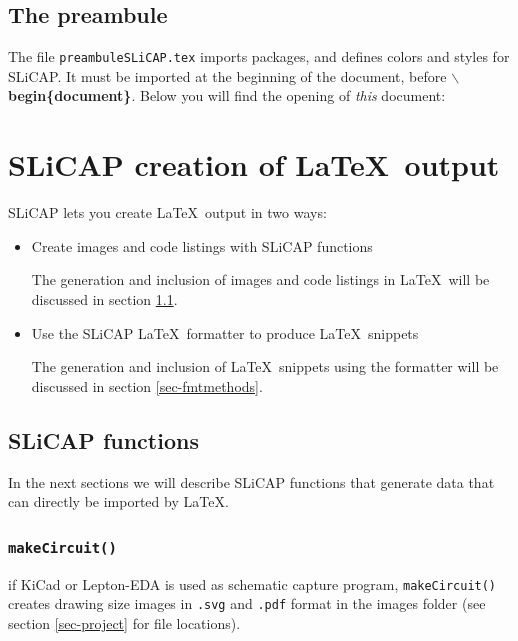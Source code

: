 \documentclass[a4paper,12pt]{article}
\begin{document}
\subsection{The preambule}
The file {\texttt{preambuleSLiCAP.tex}} imports packages, and defines colors and styles for SLiCAP. It must be imported at the beginning of the document, before {\textbf{$\backslash$begin\{document\}}}. Below you will find the opening of {\em{this}} document:



\section{SLiCAP creation of \LaTeX$\,$ output}

SLiCAP lets you create \LaTeX$\,$ output in two ways:

\begin{itemize}
\item Create images and code listings with SLiCAP functions

The generation and inclusion of images and code listings in \LaTeX$\,$ will be discussed in section \ref{sec-slicapfncts}.

\item Use the SLiCAP \LaTeX$\,$ formatter to produce \LaTeX$\,$ snippets

The generation and inclusion of \LaTeX$\,$ snippets using the formatter will be discussed in section \ref{sec-fmtmethods}.
\end{itemize}

\subsection{SLiCAP functions}\label{sec-slicapfncts}

In the next sections we will describe SLiCAP functions that generate data that can directly be imported by \LaTeX.

\subsubsection{\texttt{makeCircuit()}}

if KiCad or Lepton-EDA is used as schematic capture program, {\texttt{makeCircuit()}} creates drawing size images in {\texttt{.svg}} and {\texttt{.pdf}} format in the images folder (see section \ref{sec-project} for file locations).
\end{document}
